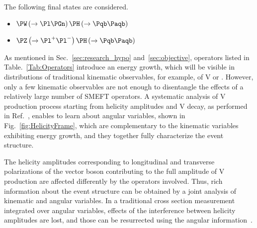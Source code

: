 \documentclass[a4paper,11pt]{article}
\newcommand{\Pb}{{{\Pqb}}\xspace}
\newcommand{\PAb}{{{{\Paqb}}}\xspace}
\renewcommand{\PV}{{{{V}}}\xspace}
\newcommand{\VH}{{{\PV}{\PH}}\xspace}
\begin{document}
The following final states are considered.
\begin{itemize}
\item $\PW\left(\to \Pl \Pgn \right) \PH \left(\to \Pb \PAb \right)$
\item $\PZ\left(\to {\Pl}^{+} {\Pl}^{-} \right) \PH \left(\to \Pb \PAb \right)$
\end{itemize}

As mentioned in Sec.~\ref{sec:research_hypo} and~\ref{sec:objective}, operators listed in Table.~\ref{Tab:Operators} introduce an energy growth, which will be visible in distributions of traditional kinematic observables, for example, \pt of \PV or \PH. 
However, only a few kinematic observables are not enough to disentangle the effects of a relatively large number of SMEFT operators. 
A systematic analysis of \VH production process starting from helicity amplitudes and \PV decay,
as performed in Ref.~\cite{Banerjee:2019twi}, 
enables to learn about angular variables, shown in Fig.~\ref{fig:HelicityFrame}, 
which are complementary to the kinematic variables exhibiting energy growth, and 
they together fully characterize the event structure.

The helicity amplitudes corresponding to longitudinal and transverse polarizations of the vector boson contributing to the full amplitude of \VH production are affected differently by the operators involved.
Thus, rich information about the event structure can be obtained by a joint analysis of kinematic and angular variables.
In a traditional cross section measurement integrated over angular variables, 
effects of the interference between helicity amplitudes are lost, and those can be resurrected using the angular information~\cite{Panico:2017frx}.
\end{document}
